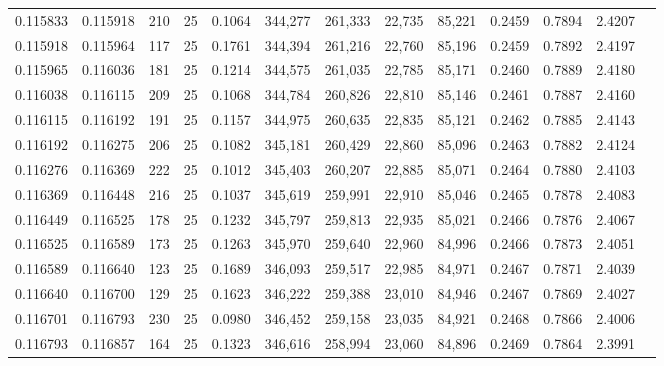 \begin{tabular}{rrrrrrrrrrrrr}
0.115833 & 0.115918 &   210 &  25 &                                     0.1064 & 344,277 & 261,333 &  22,735 &  85,221 & 0.2459 & 0.7894 & 2.4207 \\
0.115918 & 0.115964 &   117 &  25 &                                     0.1761 & 344,394 & 261,216 &  22,760 &  85,196 & 0.2459 & 0.7892 & 2.4197 \\
0.115965 & 0.116036 &   181 &  25 &                                     0.1214 & 344,575 & 261,035 &  22,785 &  85,171 & 0.2460 & 0.7889 & 2.4180 \\
0.116038 & 0.116115 &   209 &  25 &                                     0.1068 & 344,784 & 260,826 &  22,810 &  85,146 & 0.2461 & 0.7887 & 2.4160 \\
0.116115 & 0.116192 &   191 &  25 &                                     0.1157 & 344,975 & 260,635 &  22,835 &  85,121 & 0.2462 & 0.7885 & 2.4143 \\
0.116192 & 0.116275 &   206 &  25 &                                     0.1082 & 345,181 & 260,429 &  22,860 &  85,096 & 0.2463 & 0.7882 & 2.4124 \\
0.116276 & 0.116369 &   222 &  25 &                                     0.1012 & 345,403 & 260,207 &  22,885 &  85,071 & 0.2464 & 0.7880 & 2.4103 \\
0.116369 & 0.116448 &   216 &  25 &                                     0.1037 & 345,619 & 259,991 &  22,910 &  85,046 & 0.2465 & 0.7878 & 2.4083 \\
0.116449 & 0.116525 &   178 &  25 &                                     0.1232 & 345,797 & 259,813 &  22,935 &  85,021 & 0.2466 & 0.7876 & 2.4067 \\
0.116525 & 0.116589 &   173 &  25 &                                     0.1263 & 345,970 & 259,640 &  22,960 &  84,996 & 0.2466 & 0.7873 & 2.4051 \\
0.116589 & 0.116640 &   123 &  25 &                                     0.1689 & 346,093 & 259,517 &  22,985 &  84,971 & 0.2467 & 0.7871 & 2.4039 \\
0.116640 & 0.116700 &   129 &  25 &                                     0.1623 & 346,222 & 259,388 &  23,010 &  84,946 & 0.2467 & 0.7869 & 2.4027 \\
0.116701 & 0.116793 &   230 &  25 &                                     0.0980 & 346,452 & 259,158 &  23,035 &  84,921 & 0.2468 & 0.7866 & 2.4006 \\
0.116793 & 0.116857 &   164 &  25 &                                     0.1323 & 346,616 & 258,994 &  23,060 &  84,896 & 0.2469 & 0.7864 & 2.3991 \\

\end{tabular}

